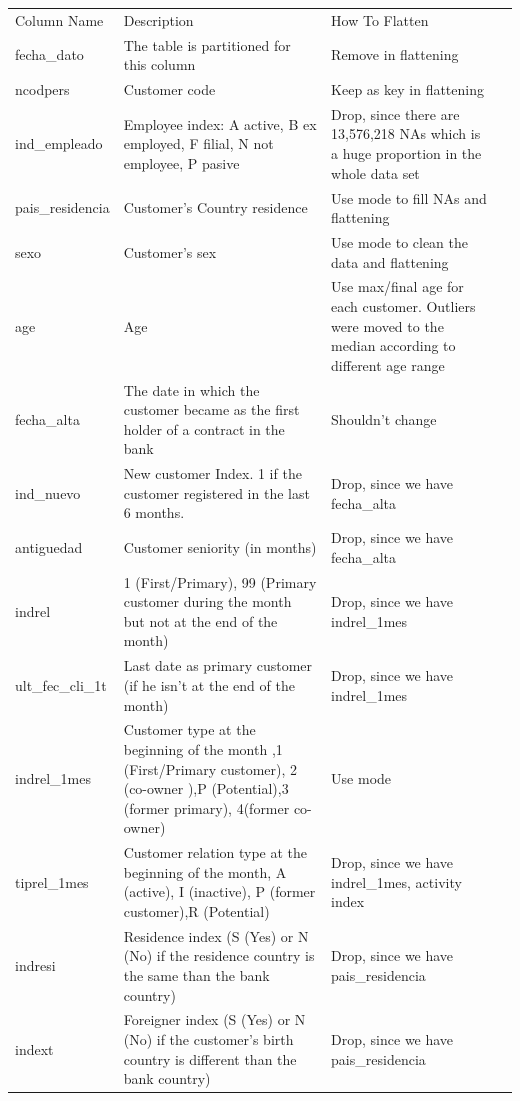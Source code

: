 \documentclass[10pt]{article}
\begin{document}
\begin{longtable}{p{3cm}p{5cm}p{5cm}p{3cm}}
Column Name & Description & How To Flatten &  \\
fecha\_dato & The table is partitioned for this column & Remove in flattening &  \\
ncodpers & Customer code & Keep as key in flattening &  \\
ind\_empleado & Employee index: A active, B ex employed, F filial, N not employee, P pasive & Drop, since there are 13,576,218 NAs which is a huge proportion in the whole data set &  \\
pais\_residencia & Customer's Country residence & Use mode to fill NAs and flattening&  \\
sexo & Customer's sex & Use mode to clean the data and flattening&  \\
age & Age & Use max/final age for each customer. Outliers were moved to the median according to different age range &  \\
fecha\_alta & The date in which the customer became as the first holder of a contract in the bank & Shouldn't change &  \\
ind\_nuevo & New customer Index. 1 if the customer registered in the last 6 months. & Drop, since we have fecha\_alta &  \\
antiguedad & Customer seniority (in months) & Drop, since we have fecha\_alta &  \\
indrel & 1 (First/Primary), 99 (Primary customer during the month but not at the end of the month) & Drop, since we have indrel\_1mes &  \\
ult\_fec\_cli\_1t & Last date as primary customer (if he isn't at the end of the month) & Drop, since we have indrel\_1mes &  \\
indrel\_1mes & Customer type at the beginning of the month ,1 (First/Primary customer), 2 (co-owner ),P (Potential),3 (former primary), 4(former co-owner) & Use mode &  \\
tiprel\_1mes & Customer relation type at the beginning of the month, A (active), I (inactive), P (former customer),R (Potential) & Drop, since we have indrel\_1mes, activity index &  \\
indresi & Residence index (S (Yes) or N (No) if the residence country is the same than the bank country) & Drop, since we have pais\_residencia &  \\
indext & Foreigner index (S (Yes) or N (No) if the customer's birth country is different than the bank country) & Drop, since we have pais\_residencia &  \\

\end{longtable}
\end{document}
